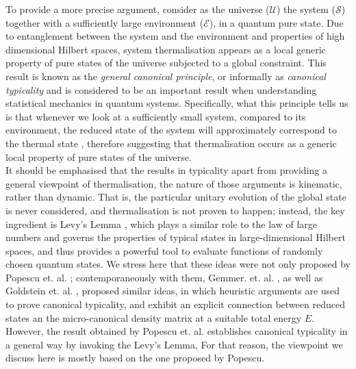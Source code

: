 \indent To provide a more precise argument, consider as the universe ($\mathcal{U}$) the system ($\mathcal{S}$) together with a sufficiently large environment ($\mathcal{E}$), in a quantum pure state. Due to entanglement between the system and the environment and properties of high dimensional Hilbert spaces, system thermalisation appears as a local generic property of pure states of the universe subjected to a global constraint. This result is known as the \textit{general canonical principle}, or informally as \textit{canonical typicality} and is considered to be an important result when understanding statistical mechanics in quantum systems. Specifically, what this principle tells us is that whenever we look at a sufficiently small system, compared to its environment, the reduced state of the system will approximately correspond to the thermal state \cite{popescu_foundations_2005, popescu_entanglement_2006, goldstein_canonical_2006, gemmer_quantum_2004},  therefore suggesting that thermalisation occurs as a generic local property of pure states of the universe.\\
\indent It should be emphasised that the results in typicality apart from providing a general viewpoint of thermalisation, the nature of those arguments is kinematic, rather than dynamic. That is, the particular unitary evolution of the global state is never considered, and thermalisation is not proven to happen; instead, the key ingredient is Levy's Lemma \cite{milman_asymptotic_2009, ledoux_concentration_2005}, which plays a similar role to the law of large numbers and governs the properties of typical states in large-dimensional Hilbert spaces\cite{popescu_foundations_2005}, and thus provides a powerful tool to evaluate functions of randomly chosen quantum states. We stress here that these ideas were not only proposed by Popescu et. al. \cite{popescu_foundations_2005}; contemporaneously with them,  Gemmer. et. al. \cite{gemmer_quantum_2004}, as well as Goldstein et. al. \cite{goldstein_canonical_2006}, proposed similar ideas, in which heuristic arguments are used to prove canonical typicality, and exhibit an explicit connection between reduced states an the micro-canonical density matrix at a suitable total energy $E$. However, the result obtained by Popescu et. al. establishes canonical typicality in a general way by invoking the Levy's Lemma\cite{popescu_foundations_2005,milman_asymptotic_2009,ledoux_concentration_2005},  For that reason, the viewpoint we discuss here is mostly based on the one proposed by Popescu.\\   
